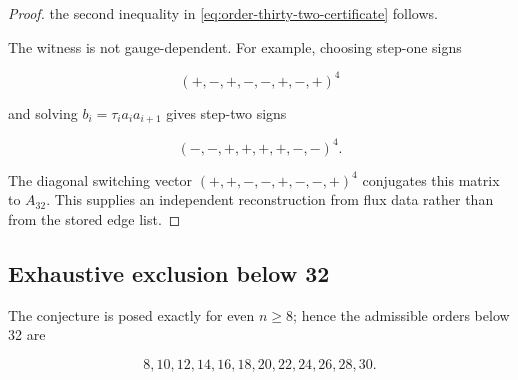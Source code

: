 \begin{proof}
the second inequality in \eqref{eq:order-thirty-two-certificate} follows.

The witness is not gauge-dependent. For example, choosing step-one signs

\begin{equation}
(+,-,+,-,-,+,-,+)^{4}
\end{equation}

and solving \(b_i=\tau_i a_i a_{i+1}\) gives step-two signs

\begin{equation}
(-,-,+,+,+,+,-,-)^{4}.
\end{equation}

The diagonal switching vector
\((+,+,-,-,+,-,-,+)^{4}\) conjugates this matrix to \(A_{32}\). This supplies an
independent reconstruction from flux data rather than from the stored edge
list.

\end{proof}
\subsection{Exhaustive exclusion below 32}

The conjecture is posed exactly for even \(n\geq 8\); hence the admissible orders
below 32 are

\begin{equation}
\label{eq:excluded-orders}
8,10,12,14,16,18,20,22,24,26,28,30.
\end{equation}

